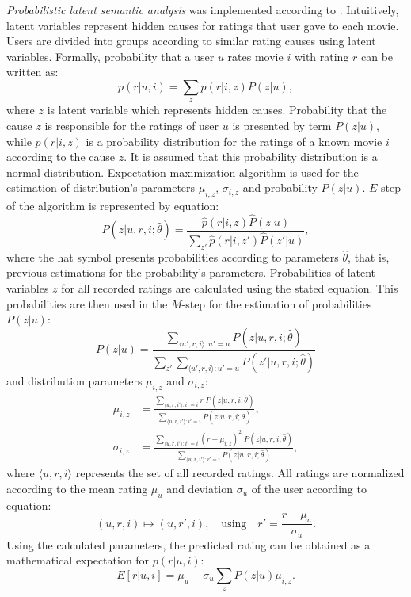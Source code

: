 \documentclass[conference,a4paper]{IEEEtran}
\begin{document}
\emph{Probabilistic latent semantic analysis} was implemented according to
\cite{hofmann2003collaborative}. Intuitively, latent variables represent hidden
causes for ratings that user gave to each movie. Users are divided into groups
according to similar rating causes using latent variables. Formally, probability
that a user $u$ rates movie $i$ with rating $r$ can be written as:
\[
p(r |u, i) = \sum\limits_z p(r | i, z) P(z | u),
\]
where $z$ is latent variable which represents hidden causes. Probability that the
cause $z$ is responsible for the ratings of user $u$ is presented by term $P(z |
u)$, while $p(r | i, z)$ is a probability distribution for the ratings of a known
movie $i$ according to the cause $z$. It is assumed that this probability
distribution is a normal distribution. Expectation maximization algorithm is used
for the estimation of distribution's parameters  $\mu_{i,z}$, $\sigma_{i,z}$ and
probability $P(z|u)$. $E$-step of the algorithm is represented by equation:
\[
P(z | u, r, i; \hat{\theta}) = \frac{\hat{p}(r | i, z) \hat{P}(z |
u)}{\sum_{z'} \hat{p}(r | i, z') \hat{P} (z' | u)},
\]
where the hat symbol presents probabilities according to parameters
$\hat{\theta}$, that is, previous estimations for the probability's parameters.
Probabilities of latent variables $z$ for all recorded ratings are calculated
using the stated equation. This probabilities are then used in the $M$-step for
the estimation of probabilities $P(z|u)$:
\[
P(z | u) = \frac{\sum_{\langle u', r, i\rangle : u' = u} P(z | u, r, i;
\hat{\theta})}{\sum_{z'}\sum_{\langle u', r, i\rangle : u' = u} P(z' | u, r, i;
\hat{\theta})}
\]
and distribution parameters $\mu_{i,z}$ and $\sigma_{i,z}$:
\begin{align*}
\mu_{i, z} &= \frac{\sum_{\langle u, r, i' \rangle : i' = i} r\; P(z|u, r,
i; \hat{\theta})}{\sum_{\langle u, r, i' \rangle : i' = i} P(z|u, r, i;
\hat{\theta})}, \\
\sigma_{i, z} &= \frac{\sum_{\langle u, r, i' \rangle : i' = i} (r -
\mu_{i,z})^2\; P(z|u, r, i; \hat{\theta})}{\sum_{\langle u, r, i' \rangle : i' =
i} P(z|u, r, i; \hat{\theta})},
\end{align*}
where $\langle u, r, i \rangle$ represents the set of all recorded ratings. All
ratings are normalized according to the mean rating $\mu_u$ and deviation
$\sigma_u$ of the user according to equation:
\begin{equation}
(u, r, i) \mapsto (u, r', i), \quad \mbox{using}\quad r'=\frac{r -
\mu_u}{\sigma_u}.
\label{eq:norm}
\end{equation}
Using the calculated parameters, the predicted rating can be obtained as a
mathematical expectation for $p(r | u, i)$:
\[
E[r | u, i] = \mu_u + \sigma_u \sum\limits_z P(z | u) \mu_{i, z}.
\]
\end{document}
